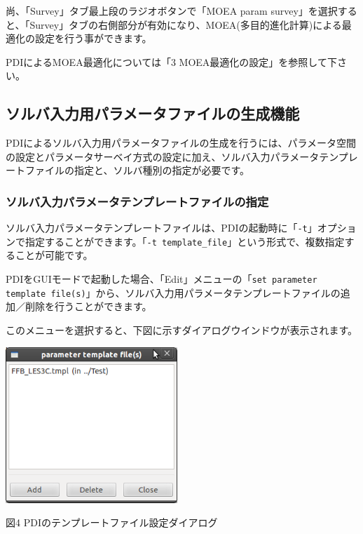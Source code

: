 \documentclass[a4paper,11pt]{jarticle}
\begin{document}
\bigskip

尚、「Survey」タブ最上段のラジオボタンで「MOEA param survey」を選択すると、「Survey」タブの右側部分が有効になり、MOEA(多目的進化計算)による最適化の設定を行う事ができます。

PDIによるMOEA最適化については「3 MOEA最適化の設定」を参照して下さい。


\subsection{ソルバ入力用パラメータファイルの生成機能}

PDIによるソルバ入力用パラメータファイルの生成を行うには、パラメータ空間の設定とパラメータサーベイ方式の設定に加え、ソルバ入力パラメータテンプレートファイルの指定と、ソルバ種別の指定が必要です。

\subsubsection{ソルバ入力パラメータテンプレートファイルの指定}

ソルバ入力パラメータテンプレートファイルは、PDIの起動時に「{\tt -t}」オプションで指定することができます。「{\tt -t template\_file}」という形式で、複数指定することが可能です。

PDIをGUIモードで起動した場合、「Edit」メニューの「{\tt set parameter template file(s)}」から、ソルバ入力用パラメータテンプレートファイルの追加／削除を行うことができます。

このメニューを選択すると、下図に示すダイアログウインドウが表示されます。

\begin{center}
\includegraphics[width=184pt, bb=0 0 327 296]{figs/fig003.png}

図4 PDIのテンプレートファイル設定ダイアログ
\end{center}
\end{document}
